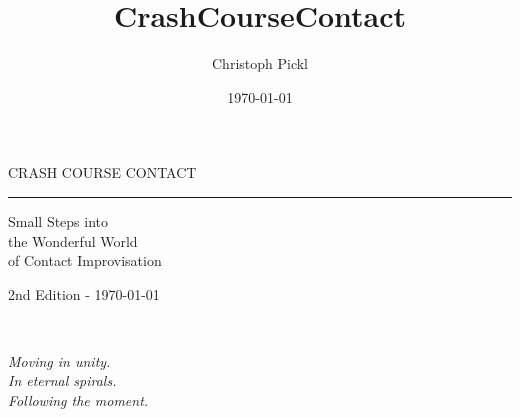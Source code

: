 \documentclass[a5paper,11pt]{book}
\title{CrashCourseContact}
\date{\today}
\author{Christoph Pickl}
\begin{document}
\begin{titlepage}
\begin{center}
	
	\vspace*{\fill}
	
	\fontsize{22}{0}\selectfont
    {\sffamily CRASH COURSE CONTACT}
	\vskip 5mm
	\rule{84mm}{0.4pt}
	\vskip 1mm
	\fontsize{15}{22}\selectfont
	{\sffamily Small Steps into \\ the Wonderful World \\ of Contact Improvisation}
	
	\vskip 70mm
	
	\vspace*{\fill}

	\fontsize{9}{0}\selectfont
	{\sffamily 2nd Edition - \today}
\end{center}
\end{titlepage}

\pagestyle{empty}

\cleardoublepage
{}
{}
\cleardoublepage
\renewcommand*\contentsname{Overview}
\setcounter{tocdepth}{1} %
\tableofcontents

\clearpage

\pagestyle{fancy}

~

\vfill
\begin{center}
	\textit{Moving in unity.}\\
	\textit{In eternal spirals.}\\
	\textit{Following the moment.}
\end{center}
\vfill
\newpage











\printglossaries
\end{document}
